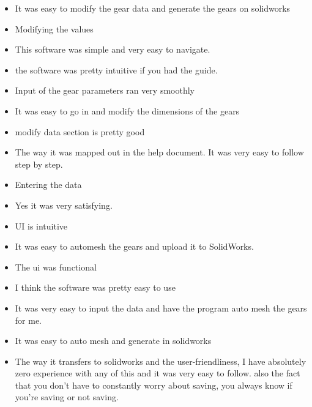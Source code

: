 \begin{itemize}
\item It was easy to modify the gear data and generate the gears on solidworks
\item Modifying the values
\item This software was simple and very easy to navigate.
\item the software was pretty intuitive if you had the guide. 
\item Input of the gear parameters ran very smoothly
\item It was easy to go in and modify the dimensions of the gears
\item modify data section is pretty good
\item The way it was mapped out in the help document. It was very easy to follow step by step.
\item Entering the data
\item Yes it was very satisfying.
\item UI is intuitive
\item It was easy to automesh the gears and upload it to SolidWorks.
\item The ui was functional
\item I think the software was pretty easy to use
\item It was very easy to input the data and have the program auto mesh the gears for me. 
\item It was easy to auto mesh and generate in solidworks
\item The way it transfers to solidworks and the user-friendliness, I have absolutely zero experience with any of this and it was very easy to follow. also the fact that you don't have to constantly worry about saving, you always know if you're saving or not saving. 
\end{itemize}

